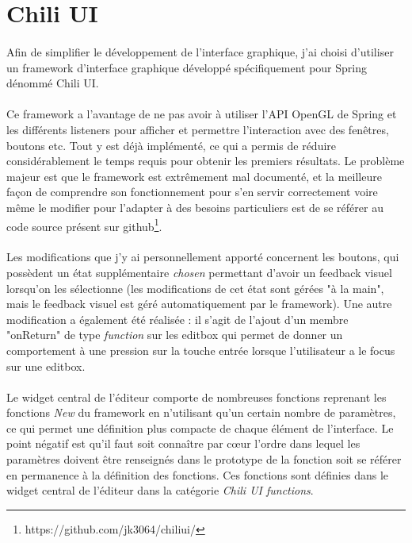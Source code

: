\documentclass[a4paper]{article}
\begin{document}
\section{Chili UI} \label{chili}
\paragraph{}
Afin de simplifier le développement de l'interface graphique, j'ai choisi d'utiliser un framework d'interface graphique développé spécifiquement pour Spring dénommé Chili UI. 
\paragraph{}
Ce framework a l'avantage de ne pas avoir à utiliser l'API OpenGL de Spring et les différents listeners pour afficher et permettre l'interaction avec des fenêtres, boutons etc. Tout y est déjà implémenté, ce qui a permis de réduire considérablement le temps requis pour obtenir les premiers résultats. Le problème majeur est que le framework est extrêmement mal documenté, et la meilleure façon de comprendre son fonctionnement pour s'en servir correctement voire même le modifier pour l'adapter à des besoins particuliers est de se référer au code source présent sur github\footnote{https://github.com/jk3064/chiliui/}.
\paragraph{}
Les modifications que j'y ai personnellement apporté concernent les boutons, qui possèdent un état supplémentaire \textit{chosen} permettant d'avoir un feedback visuel lorsqu'on les sélectionne (les modifications de cet état sont gérées "à la main", mais le feedback visuel est géré automatiquement par le framework). Une autre modification a également été réalisée : il s'agit de l'ajout d'un membre "onReturn" de type \textit{function} sur les editbox qui permet de donner un comportement à une pression sur la touche entrée lorsque l'utilisateur a le focus sur une editbox.
\paragraph{}
Le widget central de l'éditeur comporte de nombreuses fonctions reprenant les fonctions \textit{New} du framework en n'utilisant qu'un certain nombre de paramètres, ce qui permet une définition plus compacte de chaque élément de l'interface. Le point négatif est qu'il faut soit connaître par cœur l'ordre dans lequel les paramètres doivent être renseignés dans le prototype de la fonction soit se référer en permanence à la définition des fonctions. Ces fonctions sont définies dans le widget central de l'éditeur dans la catégorie \textit{Chili UI functions}.
\end{document}
